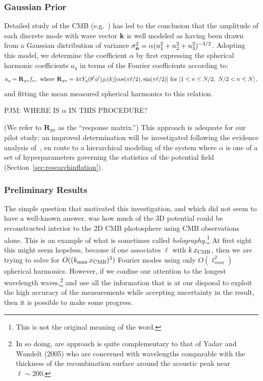 \documentclass[psfig,11pt]{article}
\begin{document}
\subsubsection{Gaussian Prior}
\label{sec:fnGaussianPrior}

Detailed study of the CMB (e.g.~\cite{Aghanim:2015xee, Ade:2015ava}) has led to the conclusion that the amplitude of each discrete mode with wave vector $\bf k$ is well modeled as having been drawn from a Gaussian distribution of variance $\sigma_{\bf n}^2=\alpha(n_1^2+n_2^2+n_3^2)^{-3/2}$. Adopting this model, we determine the coefficient $\alpha$ by first expressing the spherical harmonic coefficients $a_y$ in terms of the Fourier coefficients according to:
\begin{equation}
a_y= \mathbf{R}_{yn}f_n, ~{\rm where}~  \mathbf{R}_{yn}=4\pi Y_y(\theta'\phi')j_\ell(k)[\cos(\pi\ell/2),\sin(\pi\ell/2)]\ {\rm for}\ [1\le n\le N/2,\ N/2<n\le N]\, ,
\end{equation}
and fitting the mean measured spherical harmonics to this relation.

PJM: WHERE IS $\alpha$ IN THIS PROCEDURE?

(We refer to $\mathbf{R}_{yn}$ as the ``response matrix.'') This approach is adequate for our pilot study; an improved determination will be investigated following the evidence analysis of~\cite{Suyu2006}, en route to a hierarchical modeling of the system where $\alpha$ is one of a set of hyperparameters governing the statistics of the potential field (Section~\ref{sec:researchinflation}).


\subsubsection{Preliminary Results}

The simple question that motivated this investigation, and which did not seem to have a well-known answer, was how much of the 3D potential could be reconstructed interior to the 2D CMB photosphere using CMB observations alone. This is an example of what is sometimes called {\it holography.}\footnote{This is not the original meaning of the word.}  At first sight this might seem hopeless, because if one associates $\ell$ with $k\,x_{\rm CMB}$, then we are trying to solve for $O((k_{\rm max}\,x_{\rm CMB})^3)$ Fourier modes using only $O(\ell_{max}^2)$ spherical harmonics. However, if we confine our attention to the longest wavelength waves,\footnote{In so doing, are approach is quite complementary to that of Yadav and Wandelt (2005) who are concerned with wavelengths comparable with the thickness of the recombination surface around the acoustic peak near $\ell\sim200$.} and use all the information that is at our disposal to exploit the high accuracy of the measurements while accepting uncertainty in the result, then it is possible to make some progress.
\end{document}
